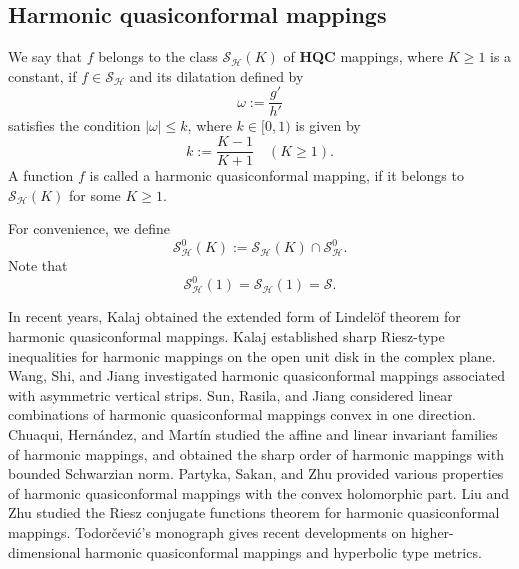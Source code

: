 \documentclass[11pt, reqno]{amsart}
\numberwithin{equation}{section}
\newcommand{\abs}[1]{\left\vert#1\right\vert}
\begin{document}
\subsection{Harmonic quasiconformal mappings}
We say that $f$ belongs to the class $\mathcal{S}_\mathcal{H}(K)$ of \textbf{HQC} mappings, where $K\ge 1$ is a constant, if $f\in\mathcal{S}_\mathcal{H}$ and its dilatation defined by $$\omega:=\frac{g'}{h'}$$ satisfies the condition 
$\abs{\omega}\leq k$, where $k\in [0,1)$ is given by
$$
k:=\frac{K-1}{K+1}\quad(K\geq 1).
$$ A function $f$ is called a harmonic quasiconformal mapping, if it belongs to $\mathcal{S}_\mathcal{H}(K)$ for some $K\ge 1$.

For convenience, we define $$\mathcal{S}^0_\mathcal{H}(K):=\mathcal{S}_\mathcal{H}(K)\cap\mathcal{S}^0_\mathcal{H}.$$
Note that $$\mathcal{S}^0_\mathcal{H}(1)=\mathcal{S}_\mathcal{H}(1)=\mathcal{S}.$$


In recent years,
Kalaj \cite{ka} obtained the extended form of Lindel\"{o}f theorem for harmonic quasiconformal mappings.
Kalaj \cite{ka2} established sharp Riesz-type inequalities for harmonic mappings on the open unit disk in the complex plane.
Wang, Shi, and Jiang \cite{wsj} investigated harmonic quasiconformal mappings associated with asymmetric vertical strips. 
Sun, Rasila, and Jiang \cite{srj} considered linear combinations of harmonic quasiconformal mappings convex
in one direction.
Chuaqui, Hern\'{a}ndez, and Mart\'{i}n \cite{chm}
studied the affine and linear invariant families of
harmonic mappings, and obtained the sharp order of harmonic mappings with bounded Schwarzian norm.
Partyka, Sakan, and Zhu \cite{psz}  provided various properties of harmonic quasiconformal mappings with the
convex holomorphic part.
Liu and Zhu \cite{lz} studied the Riesz conjugate functions theorem for harmonic quasiconformal
mappings. %
Todor\v{c}evi\'{c}'s monograph \cite{t} gives recent developments on higher-dimensional harmonic quasiconformal mappings and hyperbolic type metrics.
\end{document}
